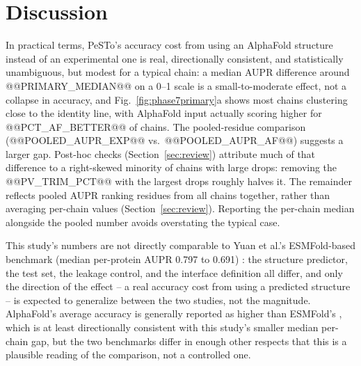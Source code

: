 \documentclass[10pt]{article}
\begin{document}
\section{Discussion}

In practical terms, PeSTo's accuracy cost from using an AlphaFold structure
instead of an experimental one is real, directionally consistent, and
statistically unambiguous, but modest for a typical chain: a median AUPR
difference around @@PRIMARY_MEDIAN@@ on a 0--1 scale is a small-to-moderate
effect, not a collapse in accuracy, and Fig.~\ref{fig:phase7primary}a shows
most chains clustering close to the identity line, with AlphaFold input
actually scoring higher for @@PCT_AF_BETTER@@ of chains. The pooled-residue
comparison (@@POOLED_AUPR_EXP@@ vs.\ @@POOLED_AUPR_AF@@) suggests a larger
gap. Post-hoc checks (Section~\ref{sec:review}) attribute much of that difference to a right-skewed
minority of chains with large drops: removing the @@PV_TRIM_PCT@@ with the
largest drops roughly halves it. The remainder reflects pooled AUPR ranking
residues from all chains together, rather than averaging per-chain values
(Section~\ref{sec:review}).
Reporting the per-chain median alongside the pooled number avoids
overstating the typical case.

This study's numbers are not directly comparable to Yuan et al.'s
ESMFold-based benchmark (median per-protein AUPR 0.797 to 0.691)
\cite{yuan2024}: the structure predictor, the test set, the leakage control,
and the interface definition all differ, and only the direction of the effect
-- a real accuracy cost from using a predicted structure -- is expected to
generalize between the two studies, not the magnitude. AlphaFold's average
accuracy is generally reported as higher than ESMFold's \cite{lin2023}, which
is at least directionally consistent with this study's smaller median
per-chain gap, but the two benchmarks differ in enough other respects that
this is a plausible reading of the comparison, not a controlled one.
\end{document}
